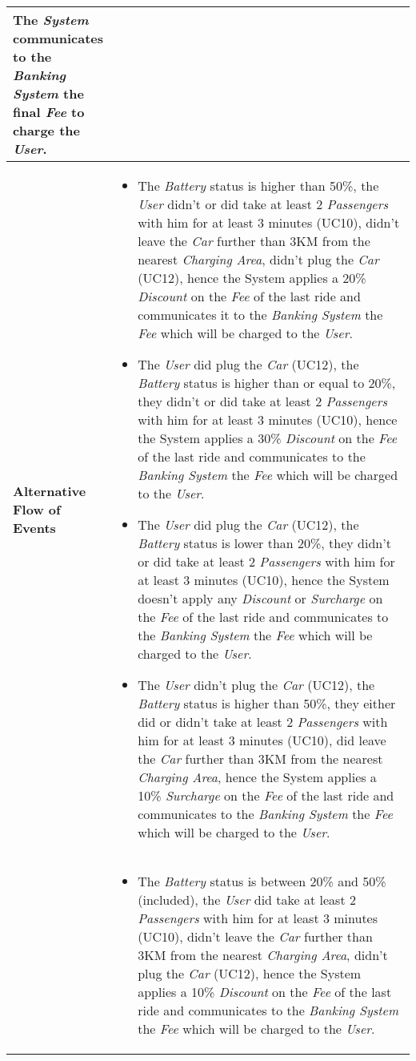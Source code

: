 \begin{longtable}{|p{0.2\linewidth} p{0.8\linewidth}|}
	The \emph{System} communicates to the \emph{Banking System} the final \emph{Fee} to charge the \emph{User}. \\ \hline
	\textbf{Alternative Flow of Events} & 
	\begin{itemize}
		\item The \emph{Battery} status is higher than 50\%, the \emph{User} didn't or did take at least 2 \emph{Passengers} with him for at least 3 minutes (UC10), didn't leave the \emph{Car} further than 3KM from the nearest \emph{Charging Area}, didn't plug the \emph{Car} (UC12), hence the System applies a 20\% \emph{Discount} on the \emph{Fee} of the last ride and communicates it to the \emph{Banking System} the \emph{Fee} which will be charged to the \emph{User}.
		\item The \emph{User} did plug the \emph{Car} (UC12), the \emph{Battery} status is higher than or equal to 20\%, they didn't or did take at least 2 \emph{Passengers} with him for at least 3 minutes (UC10), hence the System applies a 30\% \emph{Discount} on the \emph{Fee} of the last ride and communicates to the \emph{Banking System} the \emph{Fee} which will be charged to the \emph{User}.
		\item The \emph{User} did plug the \emph{Car} (UC12), the \emph{Battery} status is lower than 20\%, they didn't or did take at least 2 \emph{Passengers} with him for at least 3 minutes (UC10), hence the System doesn't apply any \emph{Discount} or \emph{Surcharge} on the \emph{Fee} of the last ride and communicates to the \emph{Banking System} the \emph{Fee} which will be charged to the \emph{User}.
		\item The \emph{User} didn't plug the \emph{Car} (UC12), the \emph{Battery} status is higher than 50\%, they either did or didn't take at least 2 \emph{Passengers} with him for at least 3 minutes (UC10), did leave the \emph{Car} further than 3KM from the nearest \emph{Charging Area}, hence the System applies a 10\% \emph{Surcharge} on the \emph{Fee} of the last ride and communicates to the \emph{Banking System} the \emph{Fee} which will be charged to the \emph{User}.
		\end{itemize} \\ &
		\begin{itemize}
		\item The \emph{Battery} status is between 20\% and 50\% (included), the \emph{User} did take at least 2 \emph{Passengers} with him for at least 3 minutes (UC10), didn't leave the \emph{Car} further than 3KM from the nearest \emph{Charging Area}, didn't plug the \emph{Car} (UC12), hence the System applies a 10\% \emph{Discount} on the \emph{Fee} of the last ride and communicates to the \emph{Banking System} the \emph{Fee} which will be charged to the \emph{User}.

\end{itemize}
\end{longtable}
